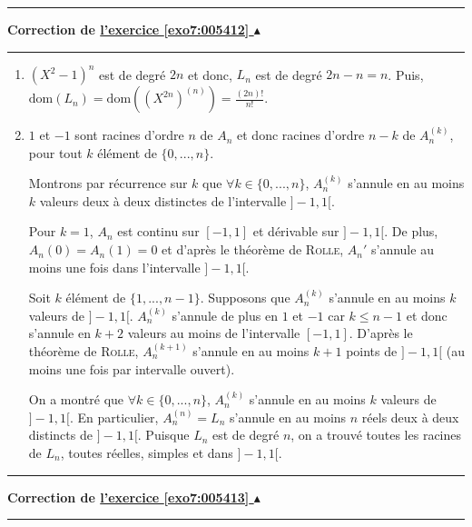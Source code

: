 \documentclass[11pt,a4paper]{article}
\newcounter{exo}
\newcommand{\correction}[1]{\hypertarget{cor7:#1}{}\label{cor7:#1}{\bf Correction de \hyperlink{exo7:#1}{l'exercice \ref{exo7:#1} $\blacktriangle$}}\vspace{1mm}\hrule\vspace{1mm}}
\newcommand{\fincorrection}{\vspace{1mm}\hrule\vspace*{7mm}}
\begin{document}
\fincorrection
\correction{005412}
\begin{enumerate}
\item  $(X^2-1)^n$ est de degré $2n$ et donc, $L_n$ est de degré $2n-n=n$. Puis, $\mbox{dom}(L_n)=\mbox{dom}((X^{2n})^{(n)})=\frac{(2n)!}{n!}$.

\item  $1$ et $-1$ sont racines d'ordre $n$ de $A_n$ et donc racines d'ordre $n-k$ de $A_n^{(k)}$, pour tout $k$ élément de $\{0,...,n\}$.

Montrons par récurrence sur $k$ que $\forall k\in\{0,...,n\}$, $A_n^{(k)}$ s'annule en au moins $k$ valeurs deux à deux distinctes de l'intervalle $]-1,1[$.

Pour $k=1$, $A_n$ est continu sur $[-1,1]$ et dérivable sur $]-1,1[$. De plus, $A_n(0)=A_n(1)=0$ et d'après le théorème de \textsc{Rolle}, $A_n'$ s'annule au moins une fois dans l'intervalle $]-1,1[$.

Soit $k$ élément de $\{1,...,n-1\}$. Supposons que $A_n^{(k)}$ s'annule en au moins $k$ valeurs de $]-1,1[$. $A_n^{(k)}$ s'annule de plus en $1$ et $-1$ car $k\leq n-1$ et donc s'annule en $k+2$ valeurs au moins de l'intervalle $[-1,1]$. D'après le théorème de \textsc{Rolle}, $A_n^{(k+1)}$ s'annule en au moins $k+1$ points de $]-1,1[$ (au moins une fois par intervalle ouvert).

On a montré que $\forall k\in\{0,...,n\}$, $A_n^{(k)}$ s'annule en au moins $k$ valeurs de $]-1,1[$. En particulier, $A_n^{(n)}=L_n$ s'annule en au moins $n$ réels deux à deux distincts de $]-1,1[$. Puisque $L_n$ est de degré $n$, on a trouvé toutes les racines de $L_n$, toutes réelles, simples et dans $]-1,1[$.
\end{enumerate}
\fincorrection
\correction{005413}
\end{document}
